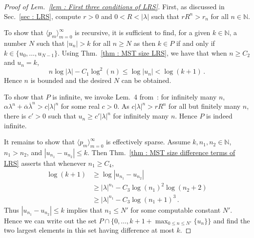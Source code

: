 \documentclass[a4paper,UKenglish,cleveref, autoref, thm-restate]{lipics-v2021}
\newcommand{\nat} {\mathbb{N}}
\begin{document}
\begin{proof}[Proof of Lem.~\ref{lem : First three conditions of LRS}]
    First, as discussed in Sec.~\ref{sec : LRS}, compute $r > 0$ and $0< R<|\lambda|$ such that $rR^n > r_n$ for all $n \in \nat$.

    To show that $\langle p_m\rangle_{m=0}^\infty$ is recursive, it is
    sufficient to find, for a given $k \in \nat$, a number $N$ such
    that $|u_n| > k$ for all $n \ge N$ as then $k \in P$ if and only if $k \in \{u_0,\dots,u_{N-1}\}$. 
    Using Thm.~\ref{thm : MST size LRS}, we have that when $n \ge C_2$ and $u_n = k$, 
    \begin{equation*}
        n\log|\lambda| - C_1 \log^2(n) \le \log|u_n| < \log(k + 1) \,  .
    \end{equation*}
    Hence $n$ is bounded and the desired $N$ can be obtained.

    To show that $P$ is infinite, we invoke Lem.~4
    from~\cite{braverman2006termination}: for infinitely many $n$,
    $\alpha \lambda^n + \overline{\alpha}\overline{\lambda}^n >
    c|\lambda|^n$ for some real $c > 0$.
    As $c|\lambda|^n > rR^n$ for all but finitely many $n$, there is
    $c' > 0$ such that $u_n \ge c' |\lambda|^n$ for infinitely many
    $n$.  Hence $P$ is indeed infinite. 
    
    It remains to show that $\langle p_m\rangle_{m=0}^\infty$ is effectively sparse.
    Assume $k, n_1, n_2\in \nat$, $n_1 > n_2$, and $|u_{n_1} - u_{n_2}| \le k$. 
    Then Thm.~\ref{thm : MST size difference terms of LRS} asserts that whenever $n_1 \ge C_4$,
    \begin{align*}
        \log(k + 1) &\ge \log|u_{n_1} - u_{n_2}|\\
        &\ge |\lambda|^{n_1} - C_3\log(n_1)^2\log(n_2+2) \\
        &\ge |\lambda|^{n_1} - C_3\log(n_1+1)^3 \, .
    \end{align*}
    Thus $|u_{n_1} - u_{n_2}| \le k$ implies that $n_1 \le N'$ for some computable constant $N'$. 
    Hence we can write out the set $P \cap \{0,\dots,k+1+ \max_{0 \le
      n \le N'} \{ u_n\}\}$ and find the two largest elements in this set having difference at most $k$. 
\end{proof}
\end{document}
